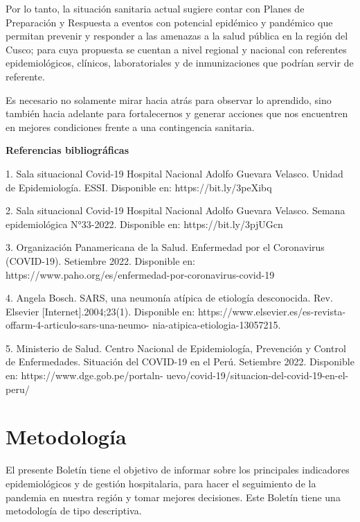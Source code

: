 \documentclass[12pt,a4paper,openany]{book}
\begin{document}
Por lo tanto, la situación sanitaria actual sugiere contar con Planes de Preparación y Respuesta a eventos con potencial epidémico y pandémico que permitan prevenir y responder a las amenazas a la salud pública en la región del Cusco; para cuya propuesta se cuentan a nivel regional y nacional con referentes epidemiológicos, clínicos, laboratoriales y de inmunizaciones que podrían servir de referente.

Es necesario no solamente mirar hacia atrás para observar lo aprendido, sino también hacia adelante para fortalecernos y generar acciones que nos encuentren en mejores condiciones frente a una contingencia sanitaria.
 



\textbf{Referencias bibliográficas}

1. Sala situacional Covid-19 Hospital Nacional Adolfo Guevara Velasco. Unidad de Epidemiología. ESSI. Disponible en:  https://bit.ly/3peXibq

2.  Sala situacional Covid-19 Hospital Nacional Adolfo Guevara Velasco. Semana epidemiológica N°33-2022. Disponible en:  https://bit.ly/3pjUGcn 

3. Organización Panamericana de la Salud. Enfermedad por el Coronavirus (COVID-19). Setiembre 2022. Disponible en: https://www.paho.org/es/enfermedad-por-coronavirus-covid-19

4. Angela Bosch. SARS, una neumonía atípica de etiología desconocida. Rev. Elsevier [Internet].2004;23(1). Disponible en: https://www.elsevier.es/es-revista-offarm-4-articulo-sars-una-neumo- nia-atipica-etiologia-13057215. 

5. Ministerio de Salud. Centro Nacional de Epidemiología, Prevención y Control de Enfermedades. Situación del COVID-19 en el Perú. Setiembre 2022. Disponible en: https://www.dge.gob.pe/portaln- uevo/covid-19/situacion-del-covid-19-en-el-peru/
	

	
		
	
	\clearpage	
	\section*{Metodología}
	
	
	
	\noindent El presente Boletín tiene el objetivo de informar sobre los principales indicadores epidemiológicos y
	de gestión hospitalaria, para hacer el seguimiento de la pandemia en nuestra región y tomar mejores decisiones. Este Boletín tiene una metodología de tipo descriptiva.
	
\end{document}
